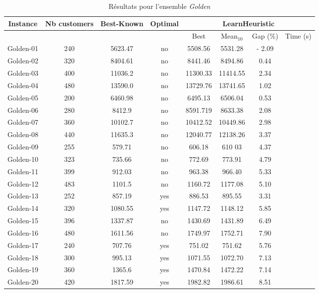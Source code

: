 \documentclass[a4paper,11pt]{article}%
\begin{document}
\begin{table}[h!]
\caption{Résultats pour l'ensemble \emph{Golden}}
\label{TG}
\begin{center}
\begin{tabular}{|@{}c@{}|@{}c@{}|@{}c@{}|@{}c@{}|@{}c@{}|@{}c@{}|@{}c@{}|@{}c@{}|}

\hline
 Instance & Nb customers & Best-Known & Optimal & \multicolumn{4}{c|}{LearnHeuristic}  \\
 \hline
 & & & & Best & Mean$_{10}$ & Gap (\%) & Time (s) \\ 
 \hline
 Golden-01 &240 & 5623.47 & no & 5508.56 & 5531.28 & - 2.09 &   \\
 \hline
 Golden-02 &320 & 8404.61 & no& 8441.46 & 8494.86 & 0.44 &    \\
  \hline
   Golden-03 &400 & 11036.2 & no& 11300.33 & 11414.55 & 2.34 &  \\
 \hline
   Golden-04 &480 &13590.0 & no& 13729.76 & 13741.65 & 1.02 &  \\
  \hline
   Golden-05 &200 & 6460.98 & no& 6495.13 & 6506.04 & 0.53 &  \\
 \hline
 Golden-06  &280 & 8412.9 &no & 8591.719 & 8633.38 & 2.08 &  \\
  \hline
  Golden-07 &360 & 10102.7 &no & 10412.52 & 10449.86 & 2.98 &  \\
 \hline
  Golden-08 &440 & 11635.3 &no & 12040.77 & 12138.26 & 3.37 &  \\
 \hline
 Golden-09 &255 & 579.71 &no & 606.18 & 610
 03 & 4.37 &  \\
 \hline
 Golden-10 &323 & 735.66 & no& 772.69 & 773.91 & 4.79 &  \\
 \hline
  Golden-11 &399 & 912.03 &no & 963.38 & 966.40 & 5.33 &   \\
  \hline
   Golden-12 &483 & 1101.5 &no & 1160.72 & 1177.08 & 5.10 &  \\
 \hline 
 Golden-13 &252 & 857.19 &yes & 886.53 & 895.55 & 3.31 & \\
  \hline
  Golden-14 &320 & 1080.55 &yes & 1147.72 & 1148.12 & 5.85 &  \\
  \hline
  Golden-15 &396 & 1337.87 & no& 1430.69 & 1431.89 & 6.49 &  \\
 \hline
   Golden-16 &480 & 1611.56 &no & 1749.97 & 1752.71 &7.90 &   \\
  \hline
  Golden-17 &240 & 707.76 & yes& 751.02 & 751.62 & 5.76 &   \\
  \hline
  Golden-18 &300 & 995.13 &yes & 1071.55 & 1072.70 & 7.13 &    \\
  \hline
  Golden-19 &360 & 1365.6 & yes& 1470.84 & 1472.22 & 7.14 & \\
 \hline 
   Golden-20 &420 & 1817.59 &yes & 1982.82 & 1986.61 & 8.51 &  \\
  \hline

\end{tabular}
\end{center}
\end{table}
\end{document}
